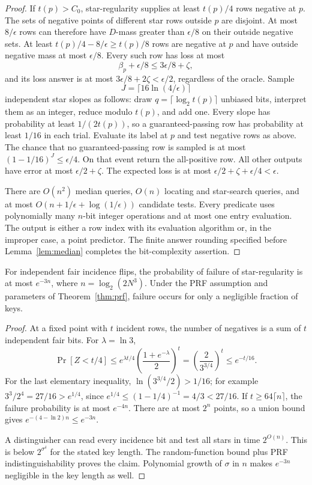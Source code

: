 \begin{proof}
If $t(p)>C_0$, star-regularity supplies at least $t(p)/4$ rows negative at $p$. The sets of negative points of different star rows outside $p$ are disjoint. At most $8/\epsilon$ rows can therefore have $D$-mass greater than $\epsilon/8$ on their outside negative sets. At least $t(p)/4-8/\epsilon\ge t(p)/8$ rows are negative at $p$ and have outside negative mass at most $\epsilon/8$. Every such row has loss at most
\[
 \beta_p+\epsilon/8\le3\epsilon/8+\zeta,
\]
and its loss answer is at most $3\epsilon/8+2\zeta<\epsilon/2$, regardless of the oracle. Sample
\[
 J=\lceil16\ln(4/\epsilon)\rceil
\]
independent star slopes as follows: draw $q=\lceil\log_2t(p)\rceil$ unbiased bits, interpret them as an integer, reduce modulo $t(p)$, and add one. Every slope has probability at least $1/(2t(p))$, so a guaranteed-passing row has probability at least $1/16$ in each trial. Evaluate its label at $p$ and test negative rows as above. The chance that no guaranteed-passing row is sampled is at most $(1-1/16)^J\le\epsilon/4$. On that event return the all-positive row. All other outputs have error at most $\epsilon/2+\zeta$. The expected loss is at most $\epsilon/2+\zeta+\epsilon/4<\epsilon$.

There are $O(n^2)$ median queries, $O(n)$ locating and star-search queries, and at most $O(n+1/\epsilon+\log(1/\epsilon))$ candidate tests. Every predicate uses polynomially many $n$-bit integer operations and at most one entry evaluation. The output is either a row index with its evaluation algorithm or, in the improper case, a point predictor. The finite answer rounding specified before Lemma~\ref{lem:median} completes the bit-complexity assertion.
\end{proof}

\begin{samepage}
\begin{lemma}\label{lem:regularstars}
For independent fair incidence flips, the probability of failure of star-regularity is at most $e^{-3n}$, where $n=\log_2(2N^3)$. Under the PRF assumption and parameters of Theorem~\ref{thm:prf}, failure occurs for only a negligible fraction of keys.
\end{lemma}
\end{samepage}
\begin{proof}
At a fixed point with $t$ incident rows, the number of negatives is a sum of $t$ independent fair bits. For $\lambda=\ln3$,
\[
 \Pr[Z<t/4]\le e^{\lambda t/4}\left(\frac{1+e^{-\lambda}}2\right)^t
 =\left(\frac{2}{3^{3/4}}\right)^t\le e^{-t/16}.
\]
For the last elementary inequality, $\ln(3^{3/4}/2)>1/16$; for example $3^3/2^4=27/16>e^{1/4}$, since $e^{1/4}\le(1-1/4)^{-1}=4/3<27/16$. If $t\ge64\lceil n\rceil$, the failure probability is at most $e^{-4n}$. There are at most $2^n$ points, so a union bound gives $e^{-(4-\ln2)n}\le e^{-3n}$.

A distinguisher can read every incidence bit and test all stars in time $2^{O(n)}$. This is below $2^{\sigma^\delta}$ for the stated key length. The random-function bound plus PRF indistinguishability proves the claim. Polynomial growth of $\sigma$ in $n$ makes $e^{-3n}$ negligible in the key length as well.
\end{proof}

